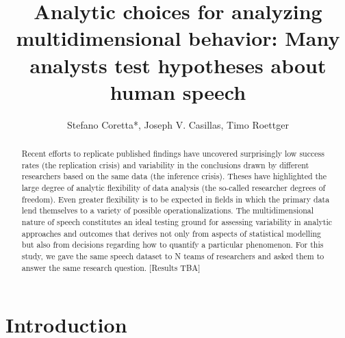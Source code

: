 \documentclass[Review,times,sageh]{sagej}
\begin{document}
\title{Analytic choices for analyzing multidimensional behavior: Many analysts test hypotheses about human speech}


\author{Stefano Coretta*, Joseph V. Casillas, Timo Roettger}




\begin{abstract}
Recent efforts to replicate published findings have uncovered surprisingly low success rates (the replication crisis) and variability in the conclusions drawn by different researchers based on the same data (the inference crisis). Theses have highlighted the large degree of analytic flexibility of data analysis (the so-called researcher degrees of freedom). Even greater flexibility is to be expected in fields in which the primary data lend themselves to a variety of possible operationalizations. The multidimensional nature of speech constitutes an ideal testing ground for assessing variability in analytic approaches and outcomes that derives not only from aspects of statistical modelling but also from decisions regarding how to quantify a particular phenomenon. For this study, we gave the same speech dataset to N teams of researchers and asked them to answer the same research question. {[}Results TBA{]}
\end{abstract}


\maketitle

\hypertarget{introduction}{%
\section{Introduction}\label{introduction}}
\end{document}
